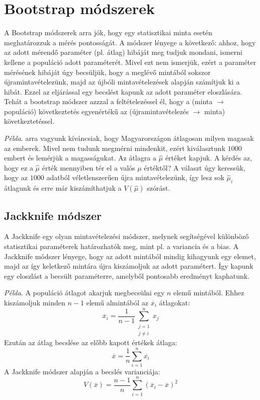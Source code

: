 \documentclass[12pt]{article}
\theoremstyle{plain}
\begin{document}
\section{Bootstrap módszerek \cite{bootstrapwiki}}
A Bootstrap módszerek arra jók, hogy egy statisztikai minta esetén meghatározzuk a mérés pontosságát. 
A módszer lényege a következő: ahhoz, hogy az adott mérendő paraméter (pl. átlag) hibáját meg tudjuk mondani,
ismerni kellene a populáció adott paraméterét. Mivel ezt nem ismerjük, ezért a paraméter mérésének hibáját úgy
becsüljük, hogy a meglévő mintából sokszor újramintavételezünk, majd az újbóli mintavételezések alapján 
számítjuk ki a hibát. Ezzel az eljárással egy becslést kapunk az adott paraméter eloszlására.
Tehát a bootstrap módszer azzzal a feltételezéssel él, hogy a (minta $\rightarrow$ populáció) következtetés
egyenértékű az (újramintavételezés $\rightarrow$ minta) következtetéssel.
\par
\textit{Példa}. arra vagyunk kíváncsiak, hogy Magyarországon átlagosan milyen magasak az emberek. Mivel nem tudunk megmérni mindenkit,
ezért kiválasztunk $1000$ embert és lemérjük a magasságukat. Az átlagra a $\hat\mu$ értéket kapjuk. A kérdés az, hogy 
ez a $\hat\mu$ érték mennyiben tér el a valós $\mu$ értéktől? A választ úgy keressük, hogy az $1000$ adatból
véletlenszerűen újra mintavételezünk, így lesz sok $\hat\mu_i$ átlagunk és erre már kiszámíthatjuk a $V(\hat\mu)$ szórást.

\subsection{Jackknife módszer \cite{JackknifeWiki}}

A Jackknife egy olyan mintavételezési módszer, melynek segítségével különböző statisztikai paraméterek határozhatók
meg, mint pl. a variancia és a bias. 
A Jackknife módszer lényege, hogy az adott mintából mindig kihagyunk egy elemet, majd az így keletkező mintára újra 
kiszámoljuk az adott paramétert. Így kapunk egy eloszlást a becsült paraméterre, amelyből pontosabb eredményt kaphatunk.
\par
\textit{Példa}. A populáció átlagot akarjuk megbecsülni egy $n$ elemű mintából. Ehhez kiszámoljuk minden $n-1$ elemű
almintából az $\overline x_i$ átlagokat:
\begin{equation*}
    \overline x_i = \frac{1}{n-1}\sum\limits_{\substack{j=1 \\ j\neq i}}^{n} x_j
\end{equation*}
Ezután az átlag becslése az előbb kapott értékek átlaga:
\begin{equation*}
    \overline{x} = \frac{1}{n}\sum\limits_{i=1}^{n}\overline{x_i}
\end{equation*}
A Jackknife módszer alapján a becslés varianciája:
\begin{equation*}
    V(\overline{x}) = \frac{n-1}{n}\sum\limits_{i=1}^{n}(\overline{x}_i - \overline{x})^2
\end{equation*}
\end{document}
